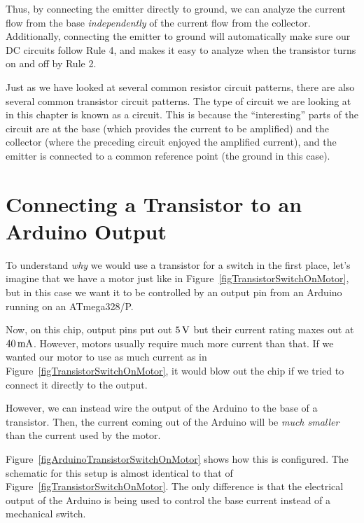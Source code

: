 Thus, by connecting the emitter directly to ground, we can analyze the current flow from the base \emph{independently} of the current flow from the collector.
Additionally, connecting the emitter to ground will automatically make sure our DC circuits follow Rule 4, and makes it easy to analyze when the transistor turns on and off by Rule 2.

Just as we have looked at several common resistor circuit patterns, there are also several common transistor circuit patterns.
The type of circuit we are looking at in this chapter is known as a  circuit.
This is because the ``interesting'' parts of the circuit are at the base (which provides the current to be amplified) and the collector (where the preceding circuit enjoyed the amplified current), and the emitter is connected to a common reference point (the ground in this case).


\section{Connecting a Transistor to an Arduino Output}

To understand \emph{why} we would use a transistor for a switch in the first place, let's imagine that we have a motor just like in Figure~\ref{figTransistorSwitchOnMotor}, but in this case we want it to be controlled by an output pin from an Arduino running on an ATmega328/P.

Now, on this chip, output pins put out $5\,\si{\volt}$ but their current rating maxes out at $40\,\si{\milli\ampere}$.
However, motors usually require much more current than that.
If we wanted our motor to use as much current as in Figure~\ref{figTransistorSwitchOnMotor}, it would blow out the chip if we tried to connect it directly to the output.

However, we can instead wire the output of the Arduino to the base of a transistor.
Then, the current coming out of the Arduino will be \emph{much smaller} than the current used by the motor.


Figure~\ref{figArduinoTransistorSwitchOnMotor} shows how this is configured.  
The schematic for this setup is almost identical to that of Figure~\ref{figTransistorSwitchOnMotor}.
The only difference is that the electrical output of the Arduino is being used to control the base current instead of a mechanical switch.

